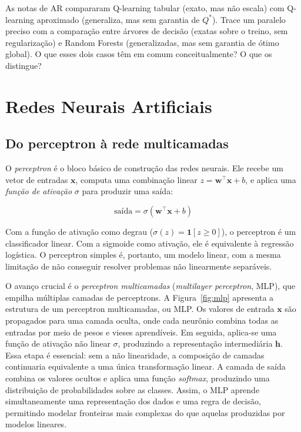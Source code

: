 \documentclass[12pt,a4paper]{article}
\begin{document}
\begin{perguntabox}
As notas de AR compararam Q-learning tabular (exato, mas não escala) com Q-learning aproximado (generaliza, mas sem garantia de $Q^*$). Trace um paralelo preciso com a comparação entre árvores de decisão (exatas sobre o treino, sem regularização) e Random Forests (generalizadas, mas sem garantia de ótimo global). O que esses dois casos têm em comum conceitualmente? O que os distingue?
\end{perguntabox}

\section{Redes Neurais Artificiais}
\label{sec:redes-neurais}

\subsection{Do perceptron à rede multicamadas}
\label{subsec:mlp}

O \emph{perceptron} é o bloco básico de construção das redes neurais. Ele recebe um vetor de entradas $\mathbf{x}$, computa uma combinação linear $z = \mathbf{w}^\top \mathbf{x} + b$, e aplica uma \emph{função de ativação} $\sigma$ para produzir uma saída:

\[
\text{saída} = \sigma(\mathbf{w}^\top \mathbf{x} + b)
\]

Com a função de ativação como degrau ($\sigma(z) = \mathbf{1}[z \geq 0]$), o perceptron é um classificador linear. Com a sigmoide como ativação, ele é equivalente à regressão logística. O perceptron simples é, portanto, um modelo linear, com a mesma limitação de não conseguir resolver problemas não linearmente separáveis.

O avanço crucial é o \emph{perceptron multicamadas} (\textit{multilayer perceptron}, MLP), que empilha múltiplas camadas de perceptrons. 
A Figura~\ref{fig:mlp} apresenta a estrutura de um perceptron multicamadas, ou MLP. Os valores de entrada $\mathbf{x}$ são propagados para uma camada oculta, onde cada neurônio combina todas as entradas por meio de pesos e vieses aprendíveis. Em seguida, aplica-se uma função de ativação não linear $\sigma$, produzindo a representação intermediária $\mathbf{h}$. Essa etapa é essencial: sem a não linearidade, a composição de camadas continuaria equivalente a uma única transformação linear. A camada de saída combina os valores ocultos e aplica uma função \textit{softmax}, produzindo uma distribuição de probabilidades sobre as classes. Assim, o MLP aprende simultaneamente uma representação dos dados e uma regra de decisão, permitindo modelar fronteiras mais complexas do que aquelas produzidas por modelos lineares.
\end{document}

